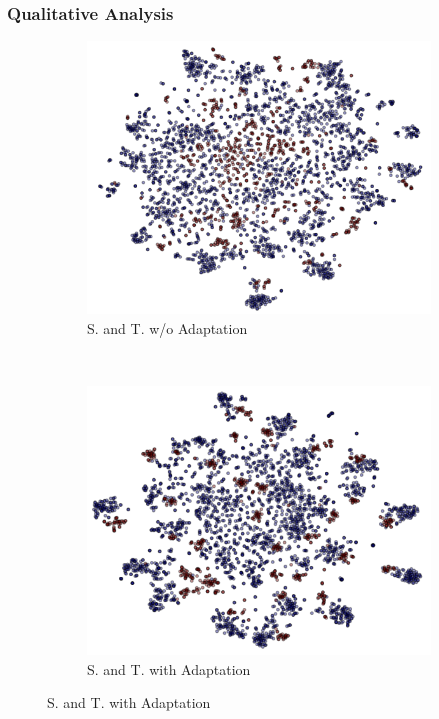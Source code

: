 \subsubsection{Qualitative Analysis}

\begin{figure}[ht]
    \begin{subfigure}[b]{0.5\textwidth}
        \includegraphics[width=\textwidth]{na_st.png}
        \caption{S. and T. w/o Adaptation}
        \label{fig:gull}
    \end{subfigure}~\begin{subfigure}[b]{0.5\textwidth}
        \includegraphics[width=\textwidth]{st.png}
        \caption{S. and T. with Adaptation}
        \label{fig:gull}
    \end{subfigure}


\end{figure}
